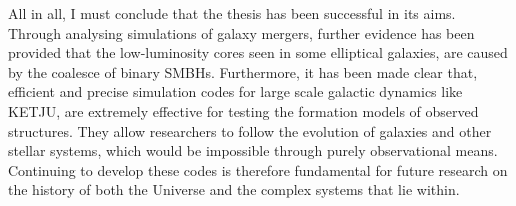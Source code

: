 \documentclass[english, twoside]{HYgradu}
\begin{document}


All in all, I must conclude that the thesis has been successful in its aims. Through analysing simulations of galaxy mergers, further evidence has been provided that the low-luminosity cores seen in some elliptical galaxies, are caused by the coalesce of binary SMBHs. Furthermore, it has been made clear that, efficient and precise simulation codes for large scale galactic dynamics like KETJU, are extremely effective for testing the formation models of observed structures. They allow researchers to follow the evolution of galaxies and other stellar systems, which would be impossible through purely observational means. Continuing to develop these codes is therefore fundamental for future research on the history of both the Universe and the complex systems that lie within.


\end{document}
